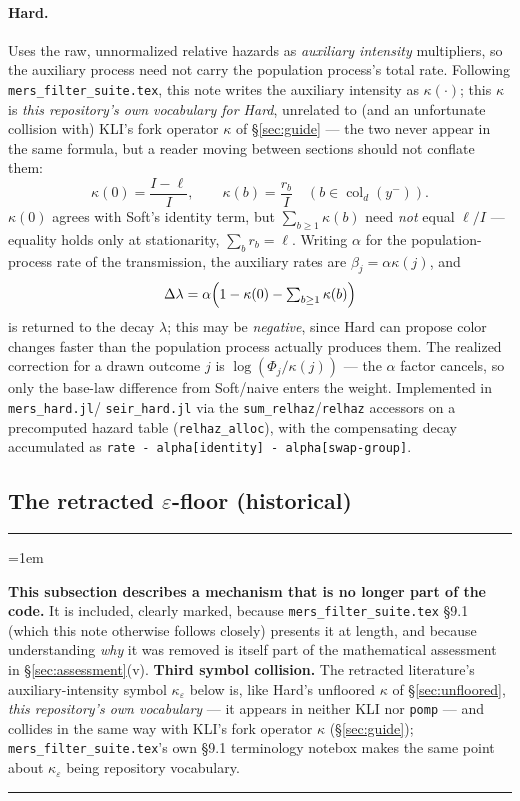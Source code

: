 \documentclass[11pt]{article}
\newcommand{\col}{\operatorname{col}}
\theoremstyle{plain}
\newenvironment{notebox}{%
  \par\addvspace{8pt}\noindent%
  {\color{chline}\rule{\linewidth}{0.8pt}}\par\smallskip%
  \begingroup\color{chline!40!black}%
  \leftskip=1em\relax
}{%
  \par\endgroup\smallskip%
  {\color{chline}\rule{\linewidth}{0.8pt}}\par\addvspace{8pt}%
}
\begin{document}
\paragraph{Hard.} Uses the raw, unnormalized relative hazards as \emph{auxiliary intensity}
multipliers, so the auxiliary process need not carry the population process's total rate. Following
\texttt{mers\_filter\_suite.tex}, this note writes the auxiliary intensity as $\kappa(\cdot)$; this
$\kappa$ is \emph{this repository's own vocabulary for Hard}, unrelated to (and an unfortunate
collision with) KLI's fork operator $\kappa$ of \S\ref{sec:guide} --- the two never appear in the
same formula, but a reader moving between sections should not conflate them:
\[
\kappa(0) = \frac{I-\ell}{I}, \qquad \kappa(b) = \frac{r_b}{I} \quad (b\in\col_d(y^-)).
\]
$\kappa(0)$ agrees with Soft's identity term, but $\sum_{b\ge1}\kappa(b)$ need \emph{not} equal
$\ell/I$ --- equality holds only at stationarity, $\sum_b r_b=\ell$. Writing $\alpha$ for the
population-process rate of the transmission, the auxiliary rates are $\beta_j=\alpha\kappa(j)$, and
\[
\Delta\lambda = \alpha\Bigl(1-\kappa(0)-\textstyle\sum_{b\ge1}\kappa(b)\Bigr)
\]
is returned to the decay $\lambda$; this may be \emph{negative}, since Hard can propose color
changes faster than the population process actually produces them. The realized correction for a
drawn outcome $j$ is $\log(\Phi_j/\kappa(j))$ --- the $\alpha$ factor cancels, so only the base-law
difference from Soft/naive enters the weight. Implemented in \texttt{mers\_hard.jl}/
\texttt{seir\_hard.jl} via the \texttt{sum\_relhaz}/\texttt{relhaz} accessors on a precomputed
hazard table (\texttt{relhaz\_alloc}), with the compensating decay accumulated as
\texttt{rate - alpha[identity] - alpha[swap-group]}.

\subsection{The retracted $\varepsilon$-floor (historical)}
\label{sec:floor-retracted}

\begin{notebox}
\textbf{This subsection describes a mechanism that is no longer part of the code.} It is included,
clearly marked, because \texttt{mers\_filter\_suite.tex} \S9.1 (which this note otherwise follows
closely) presents it at length, and because understanding \emph{why} it was removed is itself part
of the mathematical assessment in \S\ref{sec:assessment}(v). \textbf{Third symbol collision.} The
retracted literature's auxiliary-intensity symbol $\kappa_\varepsilon$ below is, like Hard's
unfloored $\kappa$ of \S\ref{sec:unfloored}, \emph{this repository's own vocabulary} --- it appears
in neither KLI nor \texttt{pomp} --- and collides in the same way with KLI's fork operator $\kappa$
(\S\ref{sec:guide}); \texttt{mers\_filter\_suite.tex}'s own \S9.1 terminology notebox makes the same
point about $\kappa_\varepsilon$ being repository vocabulary.
\end{notebox}
\end{document}
